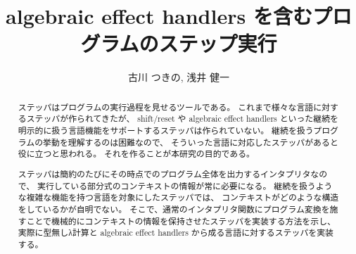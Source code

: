 \documentclass[japanese,draft]{jssst_ppl} %
\title{algebraic effect handlers を含むプログラムのステップ実行}
\author{古川 つきの, 浅井 健一}
\begin{document}
\maketitle
\begin{abstract}
  ステッパはプログラムの実行過程を見せるツールである。
  これまで様々な言語に対するステッパが作られてきたが、
  shift/reset や algebraic effect handlers
  といった継続を明示的に扱う言語機能をサポートするステッパは作られていない。
  継続を扱うプログラムの挙動を理解するのは困難なので、
  そういった言語に対応したステッパがあると役に立つと思われる。
  それを作ることが本研究の目的である。
  
  ステッパは簡約のたびにその時点でのプログラム全体を出力するインタプリタなので、
  実行している部分式のコンテキストの情報が常に必要になる。
  継続を扱うような複雑な機能を持つ言語を対象にしたステッパでは、
  コンテキストがどのような構造をしているかが自明でない。
  そこで、通常のインタプリタ関数にプログラム変換を施すことで機械的にコンテキストの情報を保持させたステッパを実装する方法を示し、
  実際に型無しλ計算と algebraic effect handlers から成る言語に対するステッパを実装する。
\end{abstract}



















\end{document}
